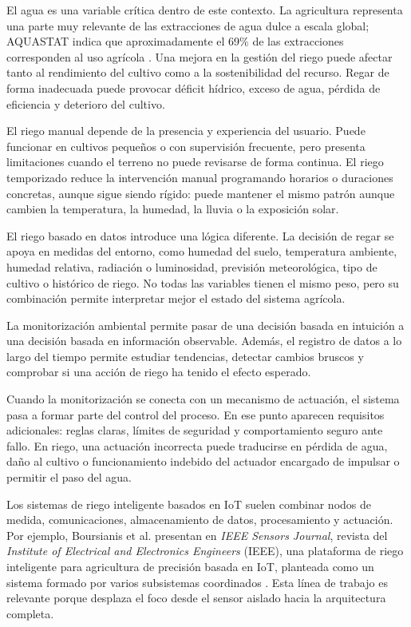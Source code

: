 El agua es una variable crítica dentro de este contexto. La agricultura representa una parte muy relevante de las extracciones de agua dulce a escala global; AQUASTAT indica que aproximadamente el 69\% de las extracciones corresponden al uso agrícola \cite{fao_aquastat_water_use}. Una mejora en la gestión del riego puede afectar tanto al rendimiento del cultivo como a la sostenibilidad del recurso. Regar de forma inadecuada puede provocar déficit hídrico, exceso de agua, pérdida de eficiencia y deterioro del cultivo.

El riego manual depende de la presencia y experiencia del usuario. Puede funcionar en cultivos pequeños o con supervisión frecuente, pero presenta limitaciones cuando el terreno no puede revisarse de forma continua. El riego temporizado reduce la intervención manual programando horarios o duraciones concretas, aunque sigue siendo rígido: puede mantener el mismo patrón aunque cambien la temperatura, la humedad, la lluvia o la exposición solar.

El riego basado en datos introduce una lógica diferente. La decisión de regar se apoya en medidas del entorno, como humedad del suelo, temperatura ambiente, humedad relativa, radiación o luminosidad, previsión meteorológica, tipo de cultivo o histórico de riego. No todas las variables tienen el mismo peso, pero su combinación permite interpretar mejor el estado del sistema agrícola.

La monitorización ambiental permite pasar de una decisión basada en intuición a una decisión basada en información observable. Además, el registro de datos a lo largo del tiempo permite estudiar tendencias, detectar cambios bruscos y comprobar si una acción de riego ha tenido el efecto esperado.

Cuando la monitorización se conecta con un mecanismo de actuación, el sistema pasa a formar parte del control del proceso. En ese punto aparecen requisitos adicionales: reglas claras, límites de seguridad y comportamiento seguro ante fallo. En riego, una actuación incorrecta puede traducirse en pérdida de agua, daño al cultivo o funcionamiento indebido del actuador encargado de impulsar o permitir el paso del agua.

Los sistemas de riego inteligente basados en IoT suelen combinar nodos de medida, comunicaciones, almacenamiento de datos, procesamiento y actuación. Por ejemplo, Boursianis et al. presentan en \textit{IEEE Sensors Journal}, revista del \textit{Institute of Electrical and Electronics Engineers} (IEEE), una plataforma de riego inteligente para agricultura de precisión basada en IoT, planteada como un sistema formado por varios subsistemas coordinados \cite{boursianis2021smart_irrigation}. Esta línea de trabajo es relevante porque desplaza el foco desde el sensor aislado hacia la arquitectura completa.

